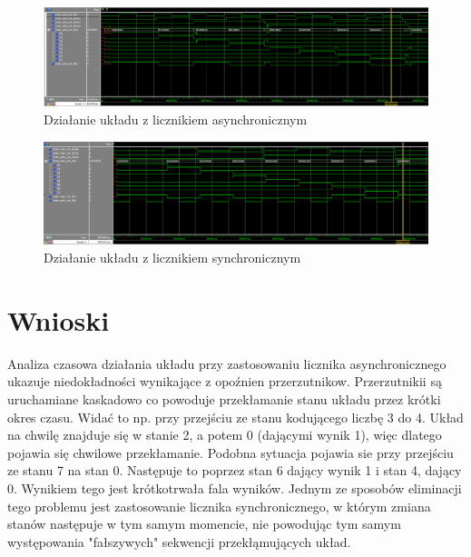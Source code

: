 \documentclass[wide,a4paper,titlepage,12pt] {article}
\begin{document}
\newpage
\begin{landscape}

  \begin{figure}[htbp]
    \begin{center}
      \includegraphics[scale=0.3]{ukl_asynch.png}
      \caption{Działanie układu z licznikiem asynchronicznym}
    \end{center}
  \end{figure}


  \begin{figure}[htbp]
    \begin{center}
      \includegraphics[scale=0.3]{ukl_synch.png}
      \caption{Działanie układu z licznikiem synchronicznym}
    \end{center}
  \end{figure}
\end{landscape}
\newpage

  \section{Wnioski}
Analiza czasowa działania układu przy zastosowaniu licznika asynchronicznego ukazuje niedokładności wynikające z opoźnien przerzutnikow. Przerzutnikii są uruchamiane kaskadowo co powoduje przekłamanie stanu układu przez krótki okres czasu. Widać to np. przy przejściu ze stanu kodującego liczbę 3 do 4. Układ na chwilę znajduje się w stanie 2, a potem 0 (dającymi wynik 1), więc dlatego pojawia się chwilowe przekłamanie. Podobna sytuacja pojawia sie przy przejściu ze stanu 7 na stan 0. Następuje to poprzez stan 6 dający wynik 1 i stan 4, dający 0. Wynikiem tego jest krótkotrwała fala wyników. Jednym ze sposobów eliminacji tego problemu jest zastosowanie licznika synchronicznego, w którym zmiana stanów następuje w tym samym momencie, nie powodując tym samym występowania "fałszywych" sekwencji przekłąmujących układ.
\end{document}
